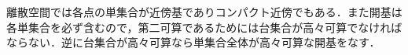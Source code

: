 \begin{prop}[離散空間の可算性と局所性]
離散空間では各点の単集合が近傍基でありコンパクト近傍でもある．また開基は各単集合を必ず含むので，第二可算であるためには台集合が高々可算でなければならない．逆に台集合が高々可算なら単集合全体が高々可算な開基をなす．
\end{prop}
